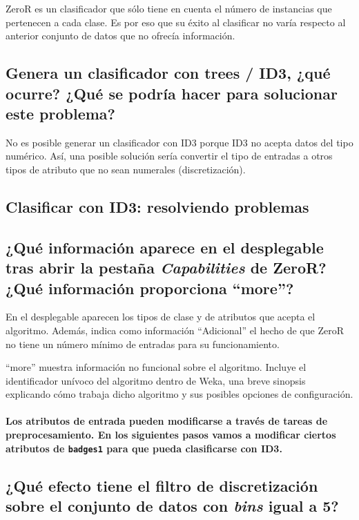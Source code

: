 \documentclass[12pt]{article}
\begin{document}
ZeroR es un clasificador que sólo tiene en cuenta el número de instancias
que pertenecen a cada clase. Es por eso que su éxito al clasificar no varía
respecto al anterior conjunto de datos que no ofrecía información.

\subsection*{\small Genera un clasificador con trees / ID3, ¿qué ocurre? ¿Qué se
podría hacer para solucionar este problema?}

No es posible generar un clasificador con ID3 porque ID3 no acepta datos del
tipo numérico. Así, una posible solución sería convertir el tipo de entradas a
otros tipos de atributo que no sean numerales (discretización).

\newpage

\begin{center}
\section{Clasificar con ID3: resolviendo problemas}
\end{center}

\subsection*{\small ¿Qué información aparece en el desplegable tras abrir la
pestaña \emph{Capabilities} de ZeroR? ¿Qué información proporciona ``more''?}

En el desplegable aparecen los tipos de clase y de atributos que acepta el
algoritmo. Además, indica como información ``Adicional'' el hecho de que ZeroR
no tiene un número mínimo de entradas para su funcionamiento.

``more'' muestra información no funcional sobre el algoritmo. Incluye el
identificador unívoco del algoritmo dentro de Weka, una breve sinopsis
explicando cómo trabaja dicho algoritmo y sus posibles opciones de
configuración.

\paragraph{\small Los atributos de entrada pueden modificarse a través de
tareas de preprocesamiento. En los siguientes pasos vamos a modificar ciertos
atributos de \texttt{badges1} para que pueda clasificarse con ID3.}

\subsection*{\small ¿Qué efecto tiene el filtro de discretización sobre el
conjunto de datos con \emph{bins} igual a 5?}
\end{document}
